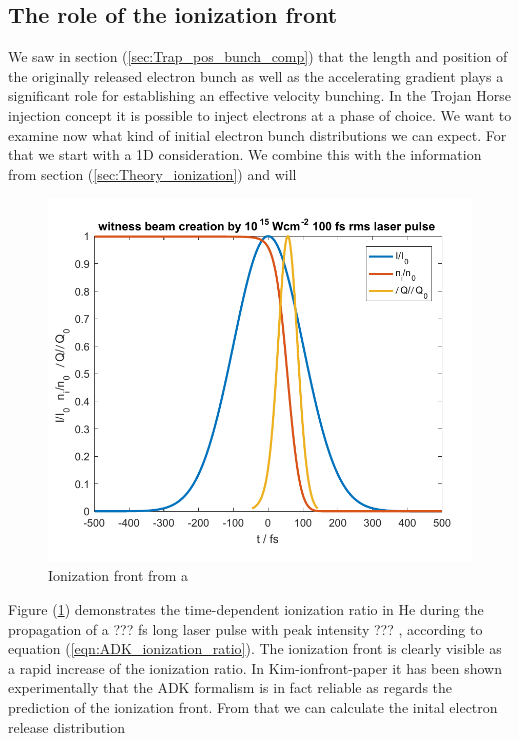 \subsection{The role of the ionization front}

We saw in section (\ref{sec:Trap_pos_bunch_comp}) that the length and position of the originally released electron bunch as well as the accelerating gradient plays a significant role for establishing an effective velocity bunching. In the Trojan Horse injection concept it is possible to inject electrons at a phase of choice. We want to examine now what kind of initial electron bunch distributions we can expect. For that we start with a 1D consideration. We combine this with the information from section (\ref{sec:Theory_ionization}) and will 

\begin{figure}[h]
\begin{center}
\includegraphics[width=1.0\textwidth]{theory/images/raw/Ionization_front.pdf}
\end{center}
\caption{Ionization front from a}
\label{img:ion_front_norm}
\end{figure}
Figure (\ref{img:ion_front_norm}) demonstrates the time-dependent ionization ratio in He during the propagation of a ??? fs long laser pulse with peak intensity ??? , according to equation (\ref{eqn:ADK_ionization_ratio}).
The ionization front is clearly visible as a rapid increase of the ionization ratio. 
In Kim-ionfront-paper  it has been shown experimentally that the ADK formalism is in fact reliable as regards the prediction of the ionization front. From that we can calculate the inital electron release distribution

